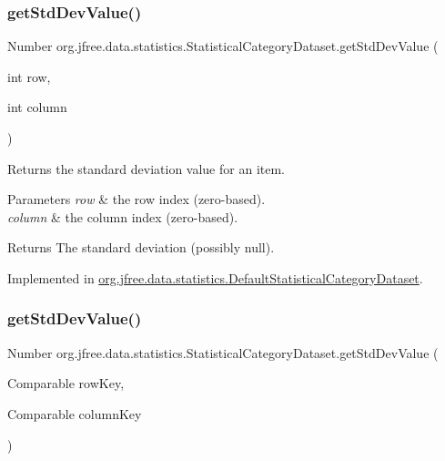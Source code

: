 \subsubsection{\texorpdfstring{get\+Std\+Dev\+Value()}{getStdDevValue()}\hspace{0.1cm}{\footnotesize\ttfamily [1/2]}}
{\footnotesize\ttfamily Number org.\+jfree.\+data.\+statistics.\+Statistical\+Category\+Dataset.\+get\+Std\+Dev\+Value (\begin{DoxyParamCaption}\item[{int}]{row,  }\item[{int}]{column }\end{DoxyParamCaption})}

Returns the standard deviation value for an item.


\begin{DoxyParams}{Parameters}
{\em row} & the row index (zero-\/based). \\
\hline
{\em column} & the column index (zero-\/based).\\
\hline
\end{DoxyParams}
\begin{DoxyReturn}{Returns}
The standard deviation (possibly {\ttfamily null}). 
\end{DoxyReturn}


Implemented in \mbox{\hyperlink{classorg_1_1jfree_1_1data_1_1statistics_1_1_default_statistical_category_dataset_a09ad7dd078ff3965d5a7f66a86e8dcbc}{org.\+jfree.\+data.\+statistics.\+Default\+Statistical\+Category\+Dataset}}.

\mbox{\label{interfaceorg_1_1jfree_1_1data_1_1statistics_1_1_statistical_category_dataset_abb476b69f5b495b75da4230921005878}} 
\subsubsection{\texorpdfstring{get\+Std\+Dev\+Value()}{getStdDevValue()}\hspace{0.1cm}{\footnotesize\ttfamily [2/2]}}
{\footnotesize\ttfamily Number org.\+jfree.\+data.\+statistics.\+Statistical\+Category\+Dataset.\+get\+Std\+Dev\+Value (\begin{DoxyParamCaption}\item[{Comparable}]{row\+Key,  }\item[{Comparable}]{column\+Key }\end{DoxyParamCaption})}

